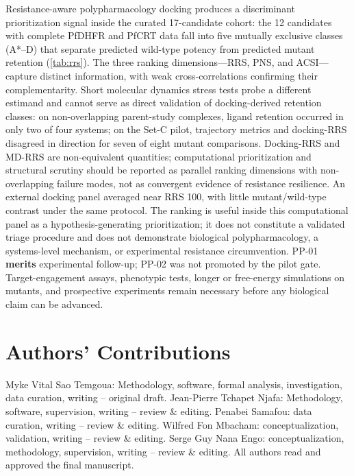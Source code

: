 \documentclass[journal=jcisd8,manuscript=article,layout=traditional]{achemso}
\begin{document}
Resistance-aware polypharmacology docking produces a discriminant prioritization signal inside the curated 17-candidate cohort: the 12 candidates with complete PfDHFR and PfCRT data fall into five mutually exclusive classes (A*–D) that separate predicted wild-type potency from predicted mutant retention (\cref{tab:rrs}). The three ranking dimensions---RRS, PNS, and ACSI---capture distinct information, with weak cross-correlations confirming their complementarity. Short molecular dynamics stress tests probe a different estimand and cannot serve as direct validation of docking-derived retention classes: on non-overlapping parent-study complexes, ligand retention occurred in only two of four systems; on the Set-C pilot, trajectory metrics and docking-RRS disagreed in direction for seven of eight mutant comparisons. Docking-RRS and MD-RRS are non-equivalent quantities; computational prioritization and structural scrutiny should be reported as parallel ranking dimensions with non-overlapping failure modes, not as convergent evidence of resistance resilience. An external docking panel averaged near RRS \num{100}, with little mutant/wild-type contrast under the same protocol. The ranking is useful inside this computational panel as a hypothesis-generating prioritization; it does not constitute a validated triage procedure and does not demonstrate biological polypharmacology, a systems-level mechanism, or experimental resistance circumvention. PP-01 \textbf{merits} experimental follow-up; PP-02 was not promoted by the pilot gate. Target-engagement assays, phenotypic tests, longer or free-energy simulations on mutants, and prospective experiments remain necessary before any biological claim can be advanced.


\section*{Authors' Contributions}

Myke Vital Sao Temgoua: Methodology, software, formal analysis, investigation, data curation, writing -- original draft. Jean-Pierre Tchapet Njafa: Methodology, software, supervision, writing -- review \& editing. Penabei Samafou: data curation, writing -- review \& editing. Wilfred Fon Mbacham: conceptualization, validation, writing -- review \& editing. Serge Guy Nana Engo: conceptualization, methodology, supervision, writing -- review \& editing. All authors read and approved the final manuscript.
\end{document}
